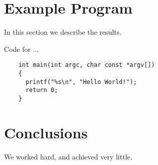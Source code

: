 \documentclass[11pt]{article}
\begin{document}
\section{Example Program}\label{results}
In this section we describe the results.
\begin{listing}[H]
  \caption{Code for ...}
  \begin{verbatim}
    int main(int argc, char const *argv[])
    {
      printf("%s\n", "Hello World!");
      return 0;
    }
  \end{verbatim}
  \label{lst:the-code}
\end{listing}

\section{Conclusions}\label{conclusions}
We worked hard, and achieved very little.



\end{document}

